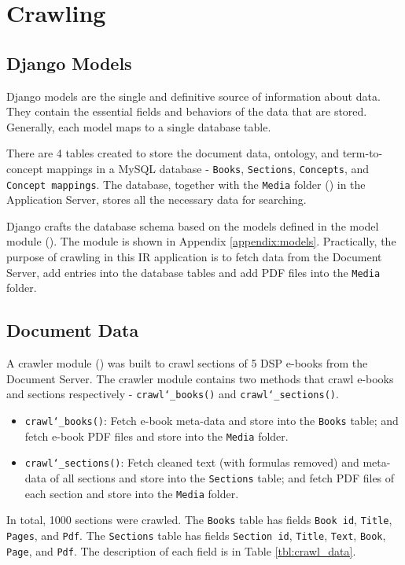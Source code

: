 \section{Crawling}
\subsection{Django Models}
Django models are the single and definitive source of information about data. They contain the essential fields and behaviors of the data that are stored. Generally, each model maps to a single database table. 

There are 4 tables created to store the document data, ontology, and term-to-concept mappings in a MySQL database - \texttt{Books}, \texttt{Sections}, \texttt{Concepts}, and \texttt{Concept mappings}. The database, together with the \texttt{Media} folder () in the Application Server, stores all the necessary data for searching.

Django crafts the database schema based on the models defined in the model module (). The module is shown in Appendix \ref{appendix:models}. Practically, the purpose of crawling in this IR application is to fetch data from the Document Server, add entries into the database tables and add PDF files into the \texttt{Media} folder.

\subsection{Document Data}
A crawler module () was built to crawl sections of 5 DSP e-books from the Document Server. The crawler module contains two methods that crawl e-books and sections respectively - \texttt{crawl\char`_books()} and \texttt{crawl\char`_sections()}. 

\begin{itemize}
\item \texttt{crawl\char`_books()}: Fetch e-book meta-data and store into the \texttt{Books} table; and fetch e-book PDF files and store into the \texttt{Media} folder.
\item \texttt{crawl\char`_sections()}: Fetch cleaned text (with formulas removed) and meta-data of all sections and store into the \texttt{Sections} table; and fetch PDF files of each section and store into the \texttt{Media} folder.
\end{itemize}

In total, 1000 sections were crawled. The \texttt{Books} table has fields \texttt{Book id}, \texttt{Title}, \texttt{Pages}, and \texttt{Pdf}. The \texttt{Sections} table has fields \texttt{Section id}, \texttt{Title}, \texttt{Text}, \texttt{Book}, \texttt{Page}, and \texttt{Pdf}. The description of each field is in Table \ref{tbl:crawl_data}.

